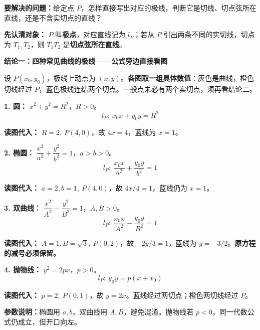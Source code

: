 \begin{statementbox}
\textbf{要解决的问题：}给定点 $P$，怎样直接写出对应的极线，判断它是切线、切点弦所在直线，还是不含实切点的直线？

\textbf{先认清对象：} $P$ 叫\textbf{极点}，对应直线记为 $l_P$；若从 $P$ 引出两条不同的实切线，切点为 $T_1,T_2$，则 $T_1T_2$ 是\textbf{切点弦所在直线}。

\medskip
\textbf{\textcolor{CStatement}{结论一：四种常见曲线的极线——公式旁边直接看图}}

设 $P(x_0,y_0)$，极线上动点为 $(x,y)$。\textbf{各图取一组具体数值}：灰色是曲线，橙色切线经过 $P$，蓝色极线连结两个切点。一般点未必有两个实切点，须再看结论二。

\begin{samepage}
\textbf{1. 圆：} $x^2+y^2=R^2$，$R>0$。
\[\boxed{l_P:\ x_0x+y_0y=R^2}\]
\begin{center}\end{center}
\noindent\textbf{读图代入：} $R=2,\ P(4,0)$，故 $4x=4$，蓝线为 $x=1$。
\end{samepage}

\medskip
\begin{samepage}
\textbf{2. 椭圆：} $\dfrac{x^2}{a^2}+\dfrac{y^2}{b^2}=1$，$a>b>0$。
\[\boxed{l_P:\ \frac{x_0x}{a^2}+\frac{y_0y}{b^2}=1}\]
\begin{center}\end{center}
\noindent\textbf{读图代入：} $a=2,b=1,\ P(4,0)$，故 $4x/4=1$，蓝线仍为 $x=1$。
\end{samepage}

\medskip
\begin{samepage}
\textbf{3. 双曲线：} $\dfrac{x^2}{A^2}-\dfrac{y^2}{B^2}=1$，$A,B>0$。
\[\boxed{l_P:\ \frac{x_0x}{A^2}-\frac{y_0y}{B^2}=1}\]
\begin{center}\end{center}
\noindent\textbf{读图代入：} $A=1,B=\sqrt3,\ P(0,2)$，故 $-2y/3=1$，蓝线为 $y=-3/2$。\textbf{原方程的减号必须保留。}
\end{samepage}

\medskip
\begin{samepage}
\textbf{4. 抛物线：} $y^2=2px$，$p>0$。
\[\boxed{l_P:\ y_0y=p(x+x_0)}\]
\begin{center}\end{center}
\noindent\textbf{读图代入：} $p=2,\ P(0,1)$，故 $y=2x$。蓝线经过两切点；橙色两切线经过 $P$。
\end{samepage}

\medskip
\textbf{参数说明：}椭圆用 $a,b$，双曲线用 $A,B$，避免混淆。抛物线若 $p<0$，同一代数公式仍成立，但开口向左。
\end{statementbox}

